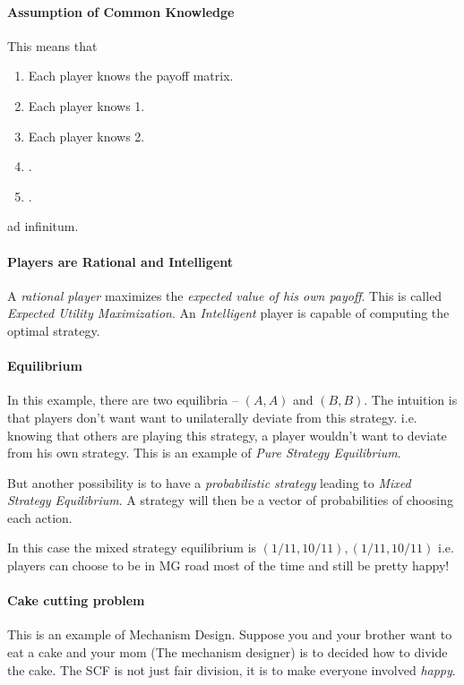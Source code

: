 \paragraph{Assumption of Common Knowledge} This means that 
\begin{enumerate}
	\item Each player knows the payoff matrix.
	\item Each player knows 1.
	\item Each player knows 2.
	\item .
	\item .
\end{enumerate}
ad infinitum. 

\paragraph{Players are Rational and Intelligent} A \textit{rational player} maximizes the \textit{expected value of his own payoff}. This is called \textit{Expected Utility Maximization}. An \textit{Intelligent} player is capable of computing the optimal strategy.

\paragraph{Equilibrium} In this example, there are two equilibria -- $(A,A)$ and $(B,B)$. The intuition is that players don't want want to unilaterally deviate from this strategy. i.e. knowing that others are playing this strategy, a player wouldn't want to deviate from his own strategy. This is an example of \textit{Pure Strategy Equilibrium}.

But another possibility is to have a \textit{probabilistic strategy} leading to \textit{Mixed Strategy Equilibrium}. A strategy will then be a vector of probabilities of choosing each action.

In this case the mixed strategy equilibrium is $(1/11, 10/11), (1/11, 10/11)$ i.e. players can choose to be in MG road most of the time and still be pretty happy!

\paragraph{Cake cutting problem} This is an example of Mechanism Design. Suppose you and your brother want to eat a cake and your mom (The mechanism designer) is to decided how to divide the cake. The SCF is not just fair division, it is to make everyone involved \textit{happy}.

